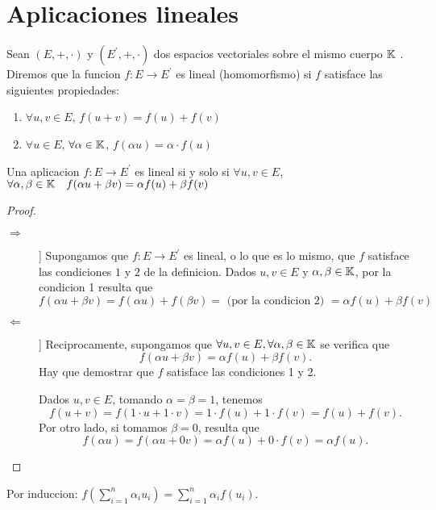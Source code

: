 \section{Aplicaciones lineales}
\begin{definition}
	Sean \((E, +, \cdot)\) y \((E^\prime, +, \cdot )\) dos espacios vectoriales sobre el mismo cuerpo \(\mathbb{K}\) . Diremos que la funcion \(f: E \to E^\prime \) es lineal (homomorfismo) si \(f \) satisface las siguientes propiedades:
	\begin{enumerate}
		\item \(\forall u,v \in E \), \(f(u+v) = f(u) + f(v )\)
		\item \(\forall u \in E \), \(\forall \alpha \in \mathbb{K} \), \(f(\alpha u) = \alpha \cdot f(u )\)
	\end{enumerate}
\end{definition}
\begin{proposition}
	Una aplicacion \(f: E \to E^\prime \) es lineal si y solo si \(\forall u,v \in E \), \(\forall  \alpha, \beta \in \mathbb{K} \quad f(\alpha u + \beta v) = \alpha f(u) + \beta f(v )\)
\end{proposition}
\begin{proof}
	\begin{description}
		\item[\(\Rightarrow\)]] Supongamos que \(f\colon E \to E^\prime  \) es lineal, o lo que es lo mismo, que \(f \) satisface las condiciones \(1 \) y \(2 \) de la definicion. Dados \(u,v \in E \) y \(\alpha,\beta \in \mathbb{K} \), por la condicion 1 resulta que
		\[
			f(\alpha u + \beta v) = f(\alpha u) + f(\beta v) = \text{ (por la condicion 2) } = \alpha f(u) + \beta f(v )
		\]
		\item[\(\Leftarrow\)]] Reciprocamente, supongamos que \(\forall u,v \in E, \forall \alpha,\beta \in \mathbb{K} \) se verifica que
		\[
			f(\alpha u + \beta v) = \alpha f(u) + \beta f(v ).
		\]
		Hay que demostrar que \(f \) satisface las condiciones 1 y 2.

		Dados \(u,v \in E \), tomando \(\alpha = \beta = 1 \), tenemos
		\[
			f(u + v) = f(1 \cdot u + 1 \cdot v) = 1 \cdot f(u) + 1 \cdot f(v) = f(u) + f(v).
		\]
		Por otro lado, si tomamos \(\beta = 0 \), resulta que
		\[
			f(\alpha u) = f(\alpha u + 0v) = \alpha f(u) + 0 \cdot f(v) = \alpha f(u).
		\]
	\end{description}

\end{proof}
Por induccion: \(f(\sum_{i=1}^{n } \alpha_i u_i) = \sum_{i=1}^{n } \alpha_i f(u_i)\).

